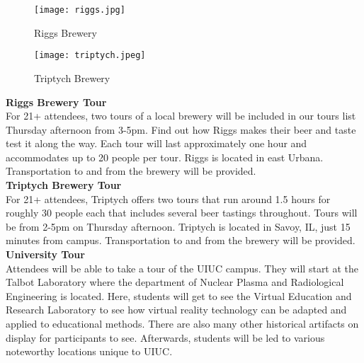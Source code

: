\setlength\intextsep{0pt}
\begin{wrapfigure}{L}{0.4\textwidth}
	\begin{center}
		\texttt{[image: riggs.jpg]}
		\caption{Riggs Brewery}
	\end{center}
\end{wrapfigure}
\setlength\intextsep{0pt}
\begin{wrapfigure}{R}{0.43\textwidth}
	\begin{center}
		\texttt{[image: triptych.jpeg]}
		\caption{Triptych Brewery}
	\end{center}
\end{wrapfigure}
\textbf{Riggs Brewery Tour}\\
For 21+ attendees, two tours of a local brewery will be included in our tours list Thursday afternoon from 3-5pm. Find out how Riggs makes their beer and taste test it along the way. Each tour will last approximately one hour and accommodates up to 20 people per tour. Riggs is located in east Urbana. Transportation to and from the brewery will be provided. \\ 

\textbf{Triptych Brewery Tour}\\
For 21+ attendees, Triptych offers two tours that run around 1.5 hours for roughly 30 people each that includes several beer tastings throughout. Tours will be from 2-5pm on Thursday afternoon. Triptych is located in Savoy, IL, just 15 minutes from campus. Transportation to and from the brewery will be provided.\\
\newline
\newline
\newline
\newline
\newline
\textbf{University Tour}\\
Attendees will be able to take a tour of the UIUC campus. They will start at the Talbot Laboratory where the department of Nuclear Plasma and Radiological Engineering is located. Here, students will get to see the Virtual Education and Research Laboratory to see how virtual reality technology can be adapted and applied to educational methods. There are also many other historical artifacts on display for participants to see. Afterwards, students will be led to various noteworthy locations unique to UIUC.\\ 	


